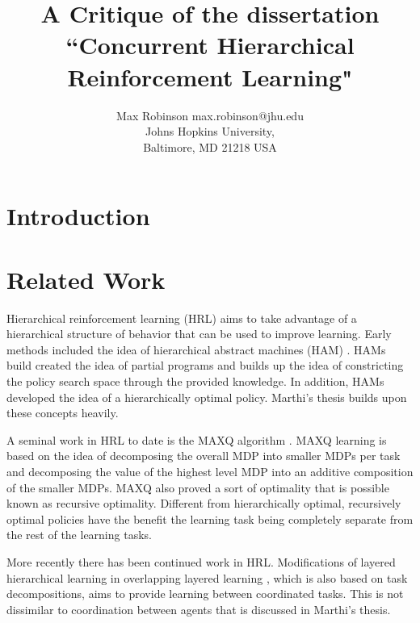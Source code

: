 \documentclass[jair,twoside,11pt,theapa]{article}
\begin{document}
\title{A Critique of the dissertation ``Concurrent Hierarchical Reinforcement Learning"}


\author{\name Max Robinson \email max.robinson@jhu.edu \\
       \addr Johns Hopkins University,\\
       Baltimore, MD 21218 USA
   }


\maketitle


\section{Introduction}
\label{Introduction}
\cite{Marthi:2006}

\section{Related Work}
\label{Related Work}
Hierarchical reinforcement learning (HRL) aims to take advantage of a hierarchical structure of behavior that can be used to improve learning. Early methods included the idea of hierarchical abstract machines (HAM) \cite {Parr:1998}. HAMs build created the idea of partial programs and builds up the idea of constricting the policy search space through the provided knowledge. In addition, HAMs developed the idea of a hierarchically optimal policy. Marthi's thesis builds upon these concepts heavily. 

A seminal work in HRL to date is the MAXQ algorithm \cite{Dietterich:2000}. MAXQ learning is based on the idea of decomposing the overall MDP into smaller MDPs per task and decomposing the value of the highest level MDP into an additive composition of the smaller MDPs. MAXQ also proved a sort of optimality that is possible known as recursive optimality. Different from hierarchically optimal, recursively optimal policies have the benefit the learning task being completely separate from the rest of the learning tasks. 

More recently there has been continued work in HRL. Modifications of layered hierarchical learning in overlapping layered learning \cite{MacAlpine:2018}, which is also based on task decompositions, aims to provide learning between coordinated tasks. This is not dissimilar to coordination between agents that is discussed in Marthi's thesis. 
\end{document}
